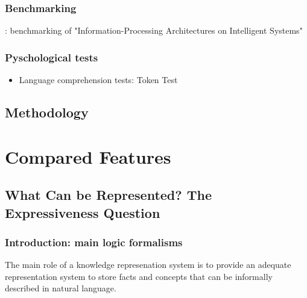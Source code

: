\documentclass[a4paper, twocolumn]{article}
\begin{document}
\subsubsection{Benchmarking}
\label{sect|benchmarking}

\cite{Hawes2008}: benchmarking of "Information-Processing Architectures on Intelligent Systems"
\subsubsection{Pyschological tests}
\label{sect|evaluation-tests}

\begin{itemize}
	\item Language comprehension tests: Token Test~\cite{DiSimoni1978}
\end{itemize}

\subsection{Methodology}
\label{sect|methodology}



\section{Compared Features}
\label{sect|compared-features}

\subsection{What Can be Represented? The Expressiveness Question}
\label{sect|intrinsic-features}


\subsubsection{Introduction: main logic formalisms}

The main role of a knowledge represenation system is to provide an adequate
representation system to store facts and concepts that can be informally
described in natural language.
\end{document}
